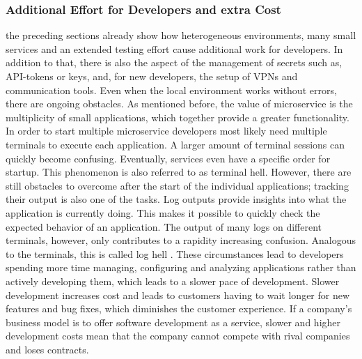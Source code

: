         \subsubsection{Additional Effort for Developers and extra Cost}
        the preceding sections already show how heterogeneous environments, many small services and an extended testing effort cause additional work for developers. In addition to that, there is also the aspect of the management of secrets such as, \ac{API}-tokens or keys, and, for new developers, the setup of \ac{VPN}s and communication tools. Even when the local environment works without errors, there are ongoing obstacles. As mentioned before, the value of microservice is the multiplicity of small applications, which together provide a greater functionality. In order to start multiple microservice developers most likely need multiple terminals to execute each application. A larger amount of terminal sessions can quickly become confusing. Eventually, services even have a specific order for startup. This phenomenon is also referred to as terminal hell. However, there are still obstacles to overcome after the start of the individual applications; tracking their output is also one of the tasks. Log outputs provide insights into what the application is currently doing. This makes it possible to quickly check the expected behavior of an application. The output of many logs on different terminals, however, only contributes to a rapidity increasing confusion. Analogous to the terminals, this is called log hell \cite{micro}.\newline
        These circumstances lead to developers spending more time managing, configuring and analyzing applications rather than actively developing them, which leads to a slower pace of development. Slower development increases cost and leads to customers having to wait longer for new features and bug fixes, which diminishes the customer experience. If a company's business model is to offer software development as a service, slower and higher development costs mean that the company cannot compete with rival companies and loses contracts.


